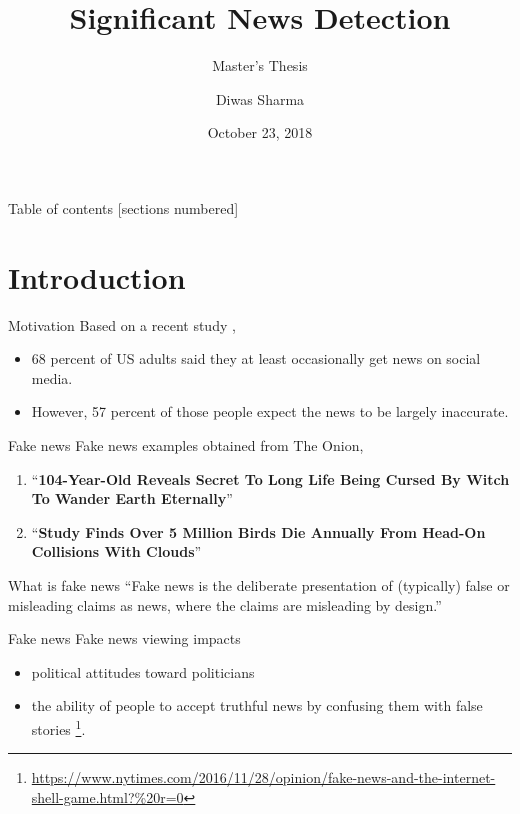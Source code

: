 \documentclass[12pt]{beamer}
\title{Significant News Detection}
\subtitle{Master's Thesis}
\date{October 23, 2018}
\author{Diwas Sharma}
\institute{The University of Alabama in Huntsville}
\begin{document}
\maketitle

\begin{frame}{Table of contents}
  [sections numbered]
  \tableofcontents[hideallsubsections]
\end{frame}

\section{Introduction}

\begin{frame}{Motivation}
    Based on a recent study \autocite{matsa2018news},
    \begin{itemize}
        \item 68 percent of US adults said they at least occasionally get news on social media.
        \item However, 57 percent of those people expect the news to be largely inaccurate.
    \end{itemize}
\end{frame}


\begin{frame}{Fake news}
    Fake news examples obtained from The Onion, \\
    \begin{enumerate}
        \item \enquote{\textbf{104-Year-Old Reveals Secret To Long Life Being Cursed By Witch To Wander Earth Eternally}} \\
        \item \enquote{\textbf{Study Finds Over 5 Million Birds Die Annually From Head-On Collisions With Clouds}} \\
    \end{enumerate}
\end{frame}

\begin{frame}{What is fake news}
    \enquote{Fake news is the deliberate presentation of (typically) false or misleading claims as news, where the claims are misleading by design.} \autocite{gelfert2018fake}
\end{frame}

\begin{frame}{Fake news }
    Fake news viewing impacts \\
    \begin{itemize}
        \item political attitudes toward politicians \autocite{balmas2014fake}
        \item the ability of people to accept truthful news by confusing them with false stories \footnote{\url{https://www.nytimes.com/2016/11/28/opinion/fake-news-and-the-internet-shell-game.html?\%20r=0}}.
    \end{itemize}
\end{frame}
\end{document}
